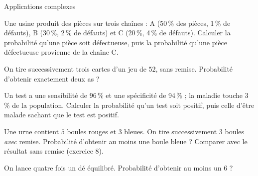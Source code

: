 \begin{exercice}[3]{Applications complexes}
\begin{questions}
  \item Une usine produit des pièces sur trois chaînes : A (50\,\% des pièces, 1\,\% de défauts), B (30\,\%, 2\,\% de défauts) et
    C (20\,\%, 4\,\% de défauts). Calculer la probabilité qu'une pièce soit défectueuse, puis la probabilité qu'une pièce
    défectueuse provienne de la chaîne C.
  \item On tire successivement trois cartes d'un jeu de $52$, sans remise. Probabilité d'obtenir exactement deux as ?
  \item Un test a une sensibilité de 96\,\% et une spécificité de 94\,\% ; la maladie touche 3\,\% de la population. Calculer la
    probabilité qu'un test soit positif, puis celle d'être malade sachant que le test est positif.
  \item Une urne contient $5$ boules rouges et $3$ bleues. On tire successivement $3$ boules \emph{avec} remise. Probabilité
    d'obtenir au moins une boule bleue ? Comparer avec le résultat sans remise (exercice 8).
  \item On lance quatre fois un dé équilibré. Probabilité d'obtenir au moins un $6$ ?
\end{questions}
\end{exercice}

